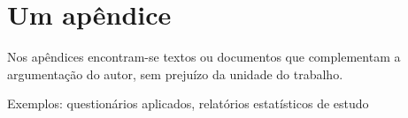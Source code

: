 
\chapter{Um apêndice}

Nos apêndices encontram-se textos ou documentos que complementam a argumentação do autor, sem prejuízo da unidade do trabalho. 

Exemplos: questionários aplicados, relatórios estatísticos de estudo

